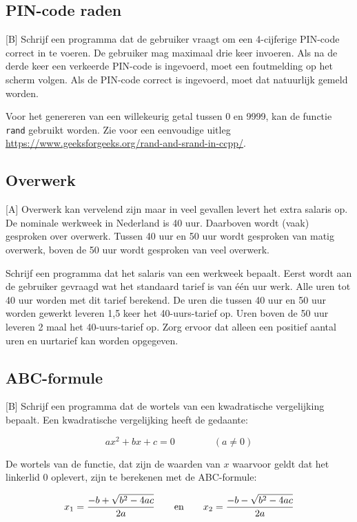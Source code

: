 \documentclass[a4paper,10pt,fleqn,twoside]{article}
\newcommand\strutrule{\rule{0mm}{1.9ex}} %
\begin{document}
\subsection{PIN-code raden}[B]
Schrijf een programma dat de gebruiker vraagt om een 4-cijferige PIN-code correct in te voeren. De gebruiker mag maximaal drie keer invoeren. Als na de derde keer een verkeerde PIN-code is ingevoerd, moet een foutmelding op het scherm volgen. Als de PIN-code correct is ingevoerd, moet dat natuurlijk gemeld worden.

Voor het genereren van een willekeurig getal tussen 0 en 9999, kan de functie \lstinline|rand| gebruikt worden. Zie voor een eenvoudige uitleg \url{https://www.geeksforgeeks.org/rand-and-srand-in-ccpp/}.

\subsection{Overwerk}[A]
Overwerk kan vervelend zijn maar in veel gevallen levert het extra salaris op. De nominale werkweek in Nederland is 40 uur. Daarboven wordt (vaak) gesproken over overwerk. Tussen 40 uur en 50 uur wordt gesproken van matig overwerk, boven de 50 uur wordt gesproken van veel overwerk.

Schrijf een programma dat het salaris van een werkweek bepaalt. Eerst wordt aan de gebruiker gevraagd wat het standaard tarief is van één uur werk. Alle uren tot 40 uur worden met dit tarief berekend. De uren die tussen 40 uur en 50 uur worden gewerkt leveren 1,5 keer het 40-uurs-tarief op. Uren boven de 50 uur leveren 2 maal het 40-uurs-tarief op. Zorg ervoor dat alleen een positief aantal uren en uurtarief kan worden opgegeven.

\subsection{ABC-formule}[B]
Schrijf een programma dat de wortels van een kwadratische vergelijking bepaalt. Een kwadratische vergelijking heeft de gedaante:

\begin{equation*}
ax^2 + bx +c = 0 \qquad\qquad (a \neq 0)
\end{equation*}

De wortels van de functie, dat zijn de waarden van $x$ waarvoor geldt dat het linkerlid 0 oplevert, zijn te berekenen met de ABC-formule:

\begin{equation*}
x_1 = \dfrac{-b+\sqrt{\strutrule b^2-4ac}}{2a} \qquad \text{en} \qquad x_2 = \dfrac{-b-\sqrt{\strutrule b^2-4ac}}{2a}
\end{equation*}
\end{document}
